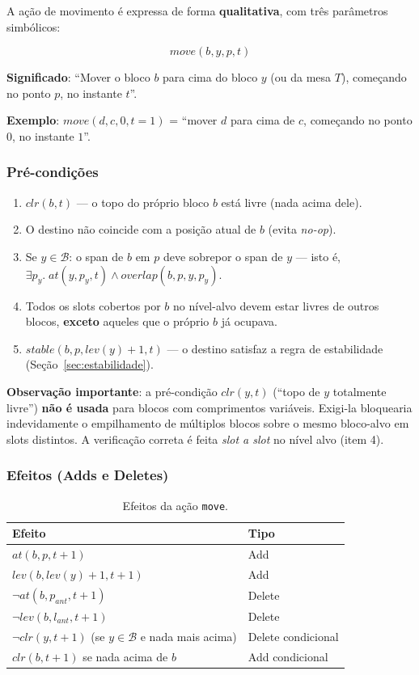 \documentclass[12pt,a4paper]{article}
\begin{document}
A ação de movimento é expressa de forma \textbf{qualitativa}, com três parâmetros simbólicos:

\[
move(b, y, p, t)
\]

\textbf{Significado}: ``Mover o bloco $b$ para cima do bloco $y$ (ou da mesa $T$), começando no ponto $p$, no instante $t$''.

\textbf{Exemplo}: $move(d, c, 0, t{=}1)$ = ``mover $d$ para cima de $c$, começando no ponto $0$, no instante $1$''.

\subsubsection{Pré-condições}

\begin{enumerate}[leftmargin=1.2cm]
    \item $clr(b,t)$ — o topo do próprio bloco $b$ está livre (nada acima dele).
    \item O destino não coincide com a posição atual de $b$ (evita \emph{no-op}).
    \item Se $y \in \mathcal{B}$: o span de $b$ em $p$ deve sobrepor o span de $y$ — isto é, $\exists p_y.\; at(y,p_y,t) \wedge overlap(b,p,y,p_y)$.
    \item Todos os slots cobertos por $b$ no nível-alvo devem estar livres de outros blocos, \textbf{exceto} aqueles que o próprio $b$ já ocupava.
    \item $stable(b,p,lev(y)+1,t)$ — o destino satisfaz a regra de estabilidade (Seção~\ref{sec:estabilidade}).
\end{enumerate}

\noindent\textbf{Observação importante}: a pré-condição $clr(y,t)$ (``topo de $y$ totalmente livre'') \textbf{não é usada} para blocos com comprimentos variáveis. Exigi-la bloquearia indevidamente o empilhamento de múltiplos blocos sobre o mesmo bloco-alvo em slots distintos. A verificação correta é feita \emph{slot a slot} no nível alvo (item 4).

\subsubsection{Efeitos (Adds e Deletes)}

\begin{table}[h!]
\centering
\begin{tabular}{@{}ll@{}}
\toprule
\textbf{Efeito} & \textbf{Tipo} \\
\midrule
$at(b,p,t+1)$ & Add \\
$lev(b, lev(y)+1, t+1)$ & Add \\
$\neg at(b, p_{ant}, t+1)$ & Delete \\
$\neg lev(b, l_{ant}, t+1)$ & Delete \\
$\neg clr(y,t+1)$ (se $y \in \mathcal{B}$ e nada mais acima) & Delete condicional \\
$clr(b,t+1)$ se nada acima de $b$ & Add condicional \\
\bottomrule
\end{tabular}
\caption{Efeitos da ação \texttt{move}.}
\end{table}
\end{document}
